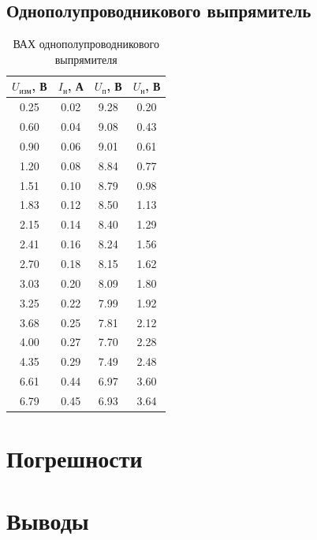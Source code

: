 \subsection{Однополупроводникового выпрямитель}

\begin{table}[H]
	\begin{center}
	\caption{ВАХ однополупроводникового выпрямителя}
	\def\arraystretch{1.2}
		\begin{tabular}{|c|c|c|c|}
		\hline 
		$U_\text{изм}$, В & $I_\text{н}$, А & $U_\text{п}$, В & $U_\text{н}$, В \\ 
		
		\hline 
		0.25 & 0.02	& 9.28 & 0.20 \\ 
		\hline 
		0.60 & 0.04	& 9.08 & 0.43 \\ 
		\hline 
		0.90 & 0.06	& 9.01 & 0.61 \\ 
		\hline 
		1.20 & 0.08	& 8.84 & 0.77 \\ 
		\hline 
		1.51 & 0.10	& 8.79 & 0.98 \\ 
		\hline 
		1.83 & 0.12	& 8.50 & 1.13 \\ 
		\hline 
		2.15 & 0.14	& 8.40 & 1.29 \\ 
		\hline 
		2.41 & 0.16	& 8.24 & 1.56 \\ 
		\hline 
		2.70 & 0.18	& 8.15 & 1.62 \\ 
		\hline 
		3.03 & 0.20	& 8.09 & 1.80 \\ 
		\hline 
		3.25 & 0.22	& 7.99 & 1.92 \\ 
		\hline 
		3.68 & 0.25	& 7.81 & 2.12 \\ 
		\hline 
		4.00 & 0.27	& 7.70 & 2.28 \\ 
		\hline 
		4.35 & 0.29	& 7.49 & 2.48 \\ 
		\hline 
		6.61 & 0.44	& 6.97 & 3.60 \\ 
		\hline 
		6.79 & 0.45 & 6.93 & 3.64 \\ 
		\hline 
		\end{tabular} 
		\label{tab:5:1}
	\end{center}
\end{table}

\section{Погрешности}

  
\section{Выводы}




